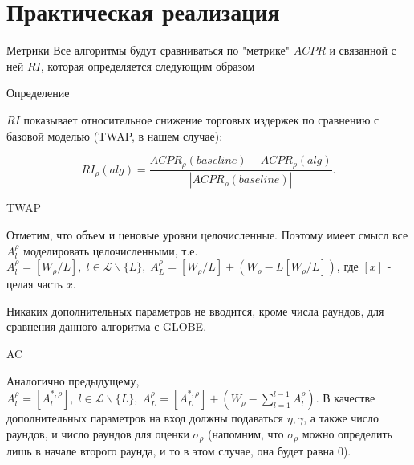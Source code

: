 \documentclass[aspectratio=169]{beamer}
\begin{document}
    \section{Практическая реализация}

        
    
    \begin{frame}{Метрики}
        Все алгоритмы будут сравниваться по "метрике" $ACPR$ и связанной с ней $RI$, которая определяется следующим образом

        \begin{block}{Определение}

            $RI$ показывает относительное снижение торговых
            издержек по сравнению с базовой моделью (TWAP, в нашем случае):
    
            \begin{equation*}
                RI_\rho(alg) = \frac{ACPR_\rho(baseline) - ACPR_{\rho}(alg)  }{|ACPR_\rho(baseline)|}.
            \end{equation*}
            
        \end{block}
        
    \end{frame}
    
    \begin{frame}{TWAP}
    
        Отметим, что объем и ценовые уровни целочисленные. Поэтому имеет смысл все $A^\rho_l$ моделировать целочисленными, т.е. $A^\rho_l = [W_\rho/L], \; l \in \mathcal L \backslash \{L\} , \; A^\rho_L = [W_\rho/L] + (W_\rho - L[W_\rho/L])$, где $[x]$ - целая часть $x$. 

        Никаких дополнительных параметров не вводится, кроме числа раундов, для сравнения данного алгоритма с GLOBE.
        
    \end{frame}

    \begin{frame}{AC}

        Аналогично предыдущему, $A^\rho_l = [A_l^{*, \rho}], \; l \in \mathcal L \backslash \{L\} , \; A^\rho_L = [A_L^{*, \rho}] + (W_\rho - \sum\limits_{l=1}^{l-1}A_l^\rho )$. В качестве дополнительных параметров на вход должны подаваться $\eta, \gamma$, а также число раундов, и число раундов для оценки $\sigma_\rho$ (напомним, что $\sigma_\rho$ можно определить лишь в начале второго раунда, и то в этом случае, она будет равна 0). 

    \end{frame}
\end{document}
